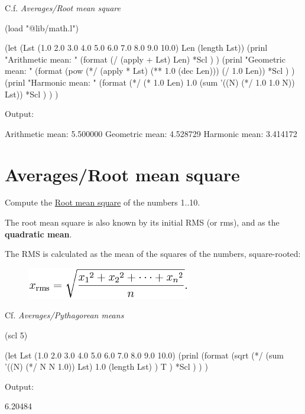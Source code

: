 C.f. \emph{Averages/Root mean square}


\begin{wideverbatim}

(load "@lib/math.l")

(let (Lst (1.0 2.0 3.0 4.0 5.0 6.0 7.0 8.0 9.0 10.0)  Len (length Lst))
   (prinl "Arithmetic mean: "
      (format
         (/ (apply + Lst) Len)
         *Scl ) )
   (prinl "Geometric mean: "
      (format
         (pow (*/ (apply * Lst) (** 1.0 (dec Len))) (/ 1.0 Len))
         *Scl ) )
   (prinl "Harmonic mean: "
      (format
         (*/ (* 1.0 Len) 1.0 (sum '((N) (*/ 1.0 1.0 N)) Lst))
         *Scl ) ) )

Output:

Arithmetic mean: 5.500000
Geometric mean: 4.528729
Harmonic mean: 3.414172

\end{wideverbatim}

\pagebreak{}
\section*{Averages/Root mean square}

Compute the \href{http://en.wikipedia.org/wiki/Root\_mean\_square}{Root
mean square} of the numbers 1..10.

The root mean square is also known by its initial RMS (or rms), and as
the \textbf{quadratic mean}.

The RMS is calculated as the mean of the squares of the numbers,
square-rooted:

\begin{figure}[htbp]
\centering
\includegraphics[scale=.6]{graphics/cf22c76e0c33c4fb96262638a28bd52b.png}
\end{figure}

Cf. \emph{Averages/Pythagorean means}


\begin{wideverbatim}

(scl 5)

(let Lst (1.0 2.0 3.0 4.0 5.0 6.0 7.0 8.0 9.0 10.0)
   (prinl
      (format
         (sqrt
            (*/
               (sum '((N) (*/ N N 1.0)) Lst)
               1.0
               (length Lst) )
            T )
         *Scl ) ) )

Output:

6.20484

\end{wideverbatim}

